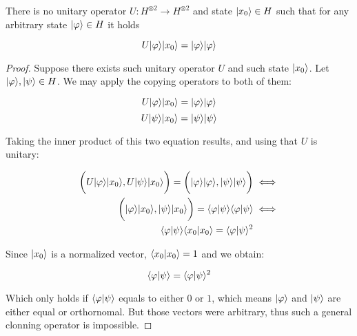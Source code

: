 \begin{theorem}
	There is no unitary operator $U: H^{\otimes 2} \longrightarrow H^{\otimes 2}$ and state $|x_0\rangle \in H$ such that for any arbitrary state $|\varphi\rangle \in H$ it holds
	
	$$ U |\varphi\rangle |x_0\rangle = |\varphi\rangle |\varphi\rangle $$
\end{theorem}
\begin{proof}
	Suppose there exists such unitary operator $U$ and such state $|x_0\rangle$. Let $|\varphi\rangle, |\psi\rangle \in H$. We may apply the copying operators to both of them:
	
	$$ U |\varphi\rangle |x_0\rangle = |\varphi\rangle |\varphi\rangle $$
	$$ U |\psi\rangle |x_0\rangle = |\psi\rangle |\psi\rangle $$
	
	Taking the inner product of this two equation results, and using that $U$ is unitary:
	
	\begin{equation*}
		\begin{split}
			\bigg( U |\varphi\rangle |x_0\rangle, U |\psi\rangle |x_0\rangle \bigg) = \bigg( |\varphi\rangle |\varphi\rangle, |\psi\rangle |\psi\rangle \bigg) & \iff \\
			\bigg( |\varphi\rangle |x_0\rangle, |\psi\rangle |x_0\rangle \bigg) = \langle\varphi|\psi\rangle \langle\varphi|\psi\rangle & \iff \\
			\langle\varphi|\psi\rangle \langle x_0|x_0 \rangle = \langle\varphi|\psi\rangle^2
		\end{split}
	\end{equation*}
	
	Since $|x_0\rangle$ is a normalized vector, $\langle x_0|x_0 \rangle = 1$ and we obtain:
	
	$$\langle\varphi|\psi\rangle = \langle\varphi|\psi\rangle^2$$
	
	Which only holds if $\langle\varphi|\psi\rangle$ equals to either $0$ or $1$, which means $|\varphi\rangle$ and $|\psi\rangle$ are either equal or orthornomal. But those vectors were arbitrary, thus such a general clonning operator is impossible. 
\end{proof}

















